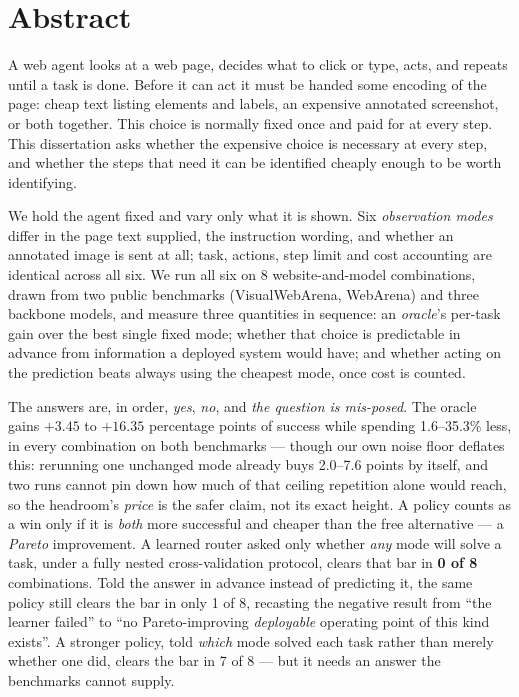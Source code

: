 
\clearpage
{
    \pagestyle{abstract}
    \chapter*{Abstract}

A web agent looks at a web page, decides what to click or type, acts, and
repeats until a task is done. Before it can act it must be handed some
encoding of the page: cheap text listing elements and labels, an expensive
annotated screenshot, or both together. This choice is normally fixed once and
paid for at every step. This dissertation asks whether the expensive choice is
necessary at every step, and whether the steps that need it can be identified
cheaply enough to be worth identifying.

We hold the agent fixed and vary only what it is shown. Six \emph{observation
modes} differ in the page text supplied, the instruction wording, and whether
an annotated image is sent at all; task, actions, step limit and cost
accounting are identical across all six. We run all six on 8
website-and-model combinations, drawn from two public benchmarks
(VisualWebArena, WebArena) and three backbone models, and measure three
quantities in sequence: an \emph{oracle}'s per-task gain over the best single
fixed mode; whether that choice is predictable in advance from information a
deployed system would have; and whether acting on the prediction beats always
using the cheapest mode, once cost is counted.

The answers are, in order, \emph{yes}, \emph{no}, and \emph{the question is
mis-posed}. The oracle gains $+3.45$ to $+16.35$ percentage points of success
while spending 1.6--35.3\% less, in every combination on both benchmarks ---
though our own noise floor deflates this: rerunning one unchanged mode already
buys 2.0--7.6 points by itself, and two runs cannot pin down how much of that
ceiling repetition alone would reach, so the headroom's \emph{price} is the
safer claim, not its exact height. A policy counts as a win only if it is
\emph{both} more successful and cheaper than the free alternative --- a
\emph{Pareto} improvement. A learned router asked only whether \emph{any} mode
will solve a task, under a fully nested cross-validation protocol, clears that
bar in \textbf{0 of 8} combinations. Told the answer in advance instead of
predicting it, the same policy still clears the bar in only 1 of 8, recasting
the negative result from ``the learner failed'' to ``no Pareto-improving
\emph{deployable} operating point of this kind exists''. A stronger policy,
told \emph{which} mode solved each task rather than merely whether one did,
clears the bar in 7 of 8 --- but it needs an answer the benchmarks cannot
supply.

}
